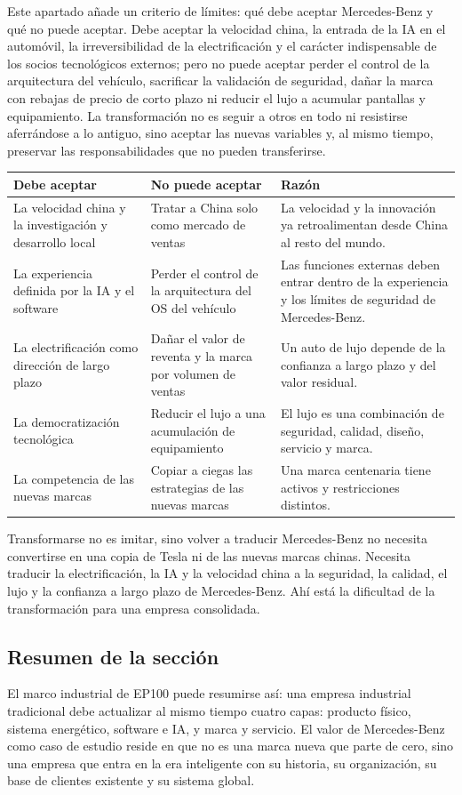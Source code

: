 Este apartado añade un criterio de límites: qué debe aceptar Mercedes-Benz y qué no puede aceptar. Debe aceptar la velocidad china, la entrada de la IA en el automóvil, la irreversibilidad de la electrificación y el carácter indispensable de los socios tecnológicos externos; pero no puede aceptar perder el control de la arquitectura del vehículo, sacrificar la validación de seguridad, dañar la marca con rebajas de precio de corto plazo ni reducir el lujo a acumular pantallas y equipamiento. La transformación no es seguir a otros en todo ni resistirse aferrándose a lo antiguo, sino aceptar las nuevas variables y, al mismo tiempo, preservar las responsabilidades que no pueden transferirse.

\noindent\begin{tabularx}{\textwidth}{p{}p{}X}
\toprule
Debe aceptar & No puede aceptar & Razón \\
\midrule
La velocidad china y la investigación y desarrollo local & Tratar a China solo como mercado de ventas & La velocidad y la innovación ya retroalimentan desde China al resto del mundo. \\
La experiencia definida por la IA y el software & Perder el control de la arquitectura del OS del vehículo & Las funciones externas deben entrar dentro de la experiencia y los límites de seguridad de Mercedes-Benz. \\
La electrificación como dirección de largo plazo & Dañar el valor de reventa y la marca por volumen de ventas & Un auto de lujo depende de la confianza a largo plazo y del valor residual. \\
La democratización tecnológica & Reducir el lujo a una acumulación de equipamiento & El lujo es una combinación de seguridad, calidad, diseño, servicio y marca. \\
La competencia de las nuevas marcas & Copiar a ciegas las estrategias de las nuevas marcas & Una marca centenaria tiene activos y restricciones distintos. \\
\bottomrule
\end{tabularx}

\begin{importantbox}{Transformarse no es imitar, sino volver a traducir}
Mercedes-Benz no necesita convertirse en una copia de Tesla ni de las nuevas marcas chinas. Necesita traducir la electrificación, la IA y la velocidad china a la seguridad, la calidad, el lujo y la confianza a largo plazo de Mercedes-Benz. Ahí está la dificultad de la transformación para una empresa consolidada.
\end{importantbox}

\subsection{Resumen de la sección}

El marco industrial de EP100 puede resumirse así: una empresa industrial tradicional debe actualizar al mismo tiempo cuatro capas: producto físico, sistema energético, software e IA, y marca y servicio. El valor de Mercedes-Benz como caso de estudio reside en que no es una marca nueva que parte de cero, sino una empresa que entra en la era inteligente con su historia, su organización, su base de clientes existente y su sistema global.
